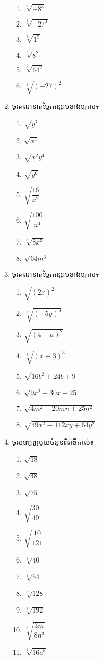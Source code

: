 \begin{enumerate}
\begin{enumerate}[k,4]
\item $\sqrt[3]{-8^3}$
\item $\sqrt[3]{-27^3}$
\item $\sqrt[3]{1^5}$
\item $\sqrt[3]{8^2}$
\item $\sqrt[3]{64^2}$
\item $\sqrt[3]{(-27)^2}$
\end{enumerate}
\item ចូរគណនាតម្លៃកន្សោមខាងក្រោម៖
\begin{enumerate}[k,4]
\item $\sqrt{y^2}$
\item $\sqrt{x^4}$
\item $\sqrt{x^2y^4}$
\item $\sqrt{y^6}$
\item $\sqrt{\dfrac{16}{x^2}}$
\item $\sqrt{\dfrac{100}{n^4}}$
\item $\sqrt[3]{8x^3}$
\item $\sqrt{64m^3}$
\end{enumerate}
\item ចូរគណនាតម្លៃកន្សោមខាងក្រោម៖
\begin{enumerate}[k,4]
\item $\sqrt{(2x)^2}$
\item $\sqrt[3]{(-5y)^3}$
\item $\sqrt{(4-a)^2}$
\item $\sqrt[3]{(x+3)^3}$
\item $\sqrt{16b^2+24b+9}$
\item $\sqrt{9x^2-30x+25}$
\item $\sqrt{4m^2-20mn+25n^2}$
\item $\sqrt{49x^2-112xy+64y^2}$
\end{enumerate}
\item ចូរបញ្ចេញមួយចំនួនពីរ៉ាឌីកាល់៖
\begin{enumerate}[k,4]
\item $\sqrt{18}$
\item $\sqrt{48}$
\item $\sqrt{75}$
\item $\sqrt{\dfrac{30}{49}}$
\item $\sqrt{\dfrac{10}{121}}$
\item $\sqrt[3]{40}$
\item $\sqrt[3]{54}$
\item $\sqrt[3]{128}$
\item $\sqrt[3]{192}$
\item $\sqrt[3]{\dfrac{3m}{8n^3}}$
\item $\sqrt[3]{16a^5}$
\end{enumerate}


\end{enumerate}

